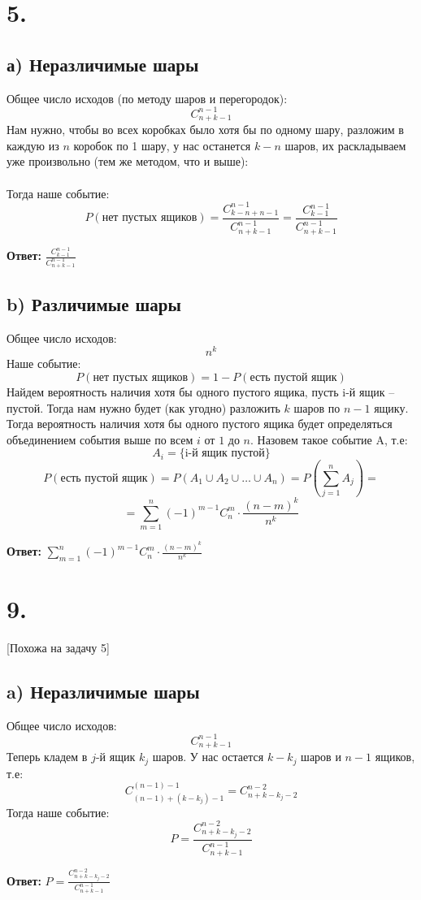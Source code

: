 \documentclass[a4paper,12pt]{article}
\begin{document}
\section*{5.}
\subsection*{а) Неразличимые шары}
Общее число исходов (по методу шаров и перегородок):
\[
C^{n -1}_{n + k - 1}
\]
Нам нужно, чтобы во всех коробках было хотя бы по одному шару, разложим в каждую из $n$ коробок по 1 шару, у нас останется $k - n$ шаров, их раскладываем уже произвольно (тем же методом, что и выше):
\\\\
Тогда наше событие:
\[
P(\text{нет пустых ящиков}) = \frac{C^{n - 1}_{k - n + n - 1}}{C^{n -1 }_{n + k - 1}} = \frac{C^{n - 1}_{k - 1}}{C^{n -1 }_{n + k - 1}}
\]
\begin{center}
\textbf{Ответ: } $\frac{C^{n - 1}_{k - 1}}{C^{n -1 }_{n + k - 1}}$
\end{center}
\subsection*{b) Различимые шары}
Общее число исходов:
\[
n^k
\]
Наше событие:
\[
P(\text{нет пустых ящиков}) = 1 - P(\text{есть пустой ящик})
\]
Найдем вероятность наличия хотя бы одного пустого ящика, пусть i-й ящик -- пустой. Тогда нам нужно будет (как угодно) разложить $k$ шаров по $n - 1$ ящику. Тогда вероятность наличия хотя бы одного пустого ящика будет определяться объединением события выше по всем $i$ от $1$ до $n$. Назовем такое событие A, т.е:
\[
A_i = \{\text{i-й ящик пустой}\}
\]
\[
P(\text{есть пустой ящик}) = P \left(A_1 \cup A_2 \cup \ldots \cup A_n \right) = P \left(\sum_{j = 1}^n A_j\right) = 
\]
\[
=
\sum_{m = 1}^{n } (-1)^{m - 1}  C_n^m \cdot \frac{(n - m)^k}{n^k}
\]
\begin{center}
\textbf{Ответ: } $ \sum\limits_{m = 1}^{n } (-1)^{m - 1}  C_n^m \cdot \frac{(n - m)^k}{n^k}$
\end{center}
\clearpage
\section*{9.}
\begin{center}
[Похожа на задачу 5]
\end{center}
\subsection*{a) Неразличимые шары}
Общее число исходов:
\[
C^{n - 1}_{n + k - 1}
\]
Теперь кладем в  $j$-й ящик $k_j$ шаров. У нас остается $k - k_j$ шаров и $n - 1$ ящиков, т.е:
\[
C^{(n - 1) - 1}_{(n - 1)+ (k - k_j) - 1} = C^{n - 2}_{n + k - k_j - 2}
\]
Тогда наше событие:
\[
P = \frac{C^{n - 2}_{n + k - k_j - 2}}{C^{n - 1}_{n + k - 1}}
\]
\begin{center}
\textbf{Ответ: } $P = \frac{C^{n - 2}_{n + k - k_j - 2}}{C^{n - 1}_{n + k - 1}}$
\end{center}
\end{document}
